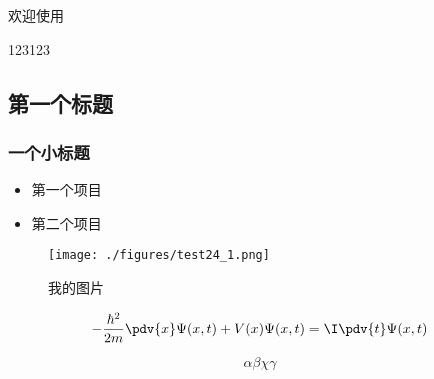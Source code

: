 
欢迎使用

123123

\subsection{第一个标题}
\subsubsection{一个小标题}

\begin{itemize}
\item 第一个项目
\item 第二个项目
\end{itemize}

\begin{figure}[ht]
\centering
\texttt{[image: ./figures/test24\_1.png]}
\caption{我的图片} \label{test24_fig1}
\end{figure}

\begin{equation}
-\frac{\hbar^2}{2m} \pdv{x} \Psi(x, t) + V(x) \Psi(x,t) = \I\pdv{t}\Psi(x,t)
\end{equation}

\begin{equation}
\alpha\beta\chi\gamma
\end{equation}
